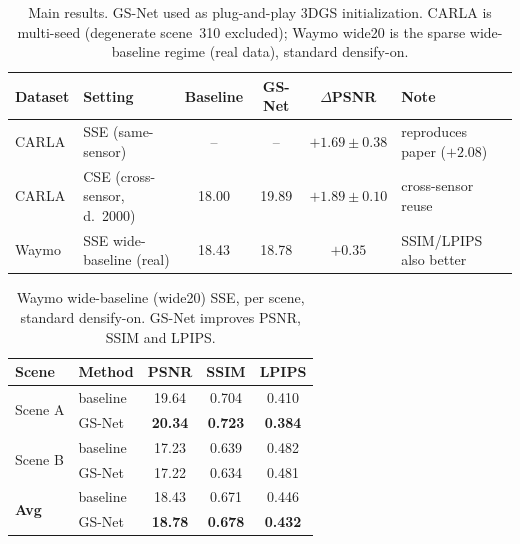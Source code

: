 \documentclass[11pt]{article}
\begin{document}
\begin{table}[t]
\centering
\caption{Main results. GS-Net used as plug-and-play 3DGS initialization.
CARLA is multi-seed (degenerate scene~310 excluded); Waymo wide20 is the
sparse wide-baseline regime (real data), standard densify-on.}
\label{tab:main}
\begin{tabular}{llcccl}
\toprule
Dataset & Setting & Baseline & GS-Net & $\Delta$PSNR & Note \\
\midrule
CARLA & SSE (same-sensor)            & --    & --    & $\mathbf{+1.69\pm0.38}$ & reproduces paper ($+2.08$) \\
CARLA & CSE (cross-sensor, d.\ 2000) & 18.00 & 19.89 & $\mathbf{+1.89\pm0.10}$ & cross-sensor reuse \\
Waymo & SSE wide-baseline (real)     & 18.43 & 18.78 & $\mathbf{+0.35}$        & SSIM/LPIPS also better \\
\bottomrule
\end{tabular}
\end{table}

\begin{table}[t]
\centering
\caption{Waymo wide-baseline (wide20) SSE, per scene, standard densify-on.
GS-Net improves PSNR, SSIM and LPIPS.}
\label{tab:waymo}
\begin{tabular}{llccc}
\toprule
Scene & Method & PSNR & SSIM & LPIPS \\
\midrule
\multirow{2}{*}{Scene A}
 & baseline & 19.64 & 0.704 & 0.410 \\
 & GS-Net   & \textbf{20.34} & \textbf{0.723} & \textbf{0.384} \\
\midrule
\multirow{2}{*}{Scene B}
 & baseline & 17.23 & 0.639 & 0.482 \\
 & GS-Net   & 17.22 & 0.634 & 0.481 \\
\midrule
\multirow{2}{*}{\textbf{Avg}}
 & baseline & 18.43 & 0.671 & 0.446 \\
 & GS-Net   & \textbf{18.78} & \textbf{0.678} & \textbf{0.432} \\
\bottomrule
\end{tabular}
\end{table}
\end{document}
